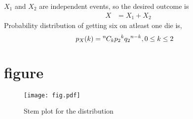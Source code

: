 \documentclass{article}
\newcommand*{\permcomb}[4][0mu]{{{}^{#3}\mkern#1#2_{#4}}}
\newcommand*{\comb}[1][-1mu]{\permcomb[#1]{C}}
\begin{document}
\begin{enumerate}[label=13.\arabic{enumi}.\arabic{enumii}]
\begin{enumerate}
$X_1$ and $X_2$ are independent events, so the desired outcome is
\begin{align}
X&=X_1+X_2
\end{align}
Probability distribution of getting six on atleast one die is,
\begin{align}
p_X(k)   &= \comb{n}{k}{p_2}^{k}{q_2}^{n-k}, 0 \le k \le 2
\end{align}

\section{figure}
\begin{figure}
\centering
\texttt{[image: fig.pdf]}
\caption{Stem plot for the distribution}
\label{fig:Plot}
\end{figure}
\end{enumerate}
\end{enumerate}
\end{document}
